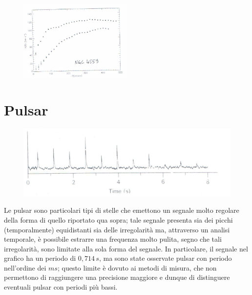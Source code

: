 \begin{figure}[h!]
	\centering
	\includegraphics[width=0.5\textwidth]{Img/bertin_7bis.png}
\end{figure}

\section{Pulsar}

\begin{figure}[h!]
	\centering
	\includegraphics[width=1\textwidth]{Img/bertin_8.jpg}
\end{figure}

Le pulsar sono particolari tipi di stelle che emettono un segnale molto regolare della forma di quello riportato qua sopra; tale segnale presenta sia dei picchi (temporalmente) equidistanti sia delle irregolarità ma, attraverso un analisi temporale, è possibile estrarre una frequenza molto pulita, segno che tali irregolarità, sono limitate alla sola forma del segnale. In particolare, il segnale nel grafico ha un periodo di $0,714 \, s$, ma sono state osservate pulsar con periodo nell'ordine dei $ms$; questo limite è dovuto ai metodi di misura, che non permettono di raggiungere una precisione maggiore e dunque di distinguere eventuali pulsar con periodi più bassi.
\\

